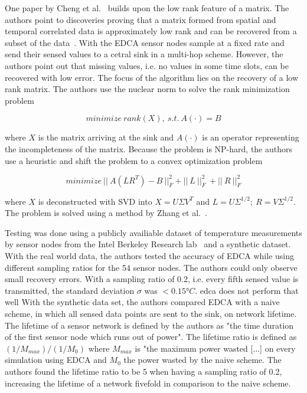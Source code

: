 One paper by Cheng et al.~\cite{cheng2010efficient} builds upon the low rank
feature of a matrix. The authors point to discoveries proving that a matrix
formed from spatial and temporal correlated data is approximately low rank and
can be recovered from a subset of the data~\cite{vuran2004spatio,
candes2009exact}. With the \ac{EDCA} sensor nodes sample at a fixed rate and
send their sensed values to a cetral sink in a multi-hop scheme. However, the
authors point out that missing values, i.e. no values in some time slots, can
be recovered with low error. The focus of the algorithm lies on the recovery of
a low rank
matrix. The authors use the nuclear norm to solve the rank minimization problem

$$
minimize \ rank(X), \ s.t. \ A(\cdot)=B
$$

where $ X $ is the matrix arriving at the sink and $ A(\cdot) $ is an operator
representing the incompleteness of the matrix. Because the problem is NP-hard,
the authors use a heuristic and shift the problem to a convex optimization
problem

$$
minimize \ || \ A(LR^T) - B \ ||^2_F + || \ L \ ||^2_F \ + || \ R \ ||^2_F
$$

where $ X $ is deconstructed with \ac{SVD} into $ X = U \Sigma V^T $ and $ L =
U\Sigma^{1/2}; \ R = V\Sigma^{1/2}$. The problem is solved using a method by
Zhang et al.~\cite{zhang2009spatio}.

Testing was done using a publicly availiable dataset of temperature
measurements by sensor nodes from the Intel Berkeley Research
lab~\cite{labdata} and a synthetic dataset. With the real world data, the
authors tested the accuracy of \ac{EDCA} while using different sampling ratios
for the 54 sensor nodes. The authors could only observe small recovery errors.
With a sampling ratio of 0.2, i.e. every fifth sensed value is transmitted, the
standard deviation $ \sigma $ was $ < 0.15°C $. %
edca does not perform that well With the synthetic data set, the authors
compared \ac{EDCA} with a naive scheme, in which all sensed data points are
sent to the sink, on network lifetime. The lifetime of a sensor network is
defined by the authors as "the time duration of the first sensor node which
runs out of power". The lifetime ratio is defined as $ (1/M_{max}) / (1/M_0) $
where $ M_{max} $ is "the maximum power wasted [...] on every simulation using
\ac{EDCA} and $ M_0 $ the power wasted by the naive scheme. The authors found
the lifetime ratio to be 5 when having a sampling ratio of 0.2, increasing the
lifetime of a network fivefold in comparison to the naive scheme.


